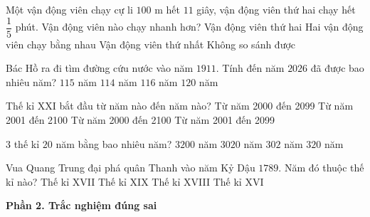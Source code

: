 \begin{ex} %
Một vận động viên chạy cự li $100\text{ m}$ hết $11$ giây, vận động viên thứ hai chạy hết $\dfrac{1}{5}$ phút. Vận động viên nào chạy nhanh hơn?
\choice
{Vận động viên thứ hai}
{Hai vận động viên chạy bằng nhau}
{\True Vận động viên thứ nhất}
{Không so sánh được}
\end{ex}

\begin{ex} %
Bác Hồ ra đi tìm đường cứu nước vào năm $1911$. Tính đến năm $2026$ đã được bao nhiêu năm?
\choice
{\True $115$ năm}
{$114$ năm}
{$116$ năm}
{$120$ năm}
\end{ex}

\begin{ex} %
Thế kỉ XXI bắt đầu từ năm nào đến năm nào?
\choice
{Từ năm 2000 đến 2099}
{\True Từ năm 2001 đến 2100}
{Từ năm 2000 đến 2100}
{Từ năm 2001 đến 2099}
\end{ex}

\begin{ex} %
$3$ thế kỉ $20$ năm bằng bao nhiêu năm?
\choice
{$3200$ năm}
{$3020$ năm}
{$302$ năm}
{\True $320$ năm}
\end{ex}

\begin{ex} %
Vua Quang Trung đại phá quân Thanh vào năm Kỷ Dậu $1789$. Năm đó thuộc thế kỉ nào?
\choice
{Thế kỉ XVII}
{Thế kỉ XIX}
{\True Thế kỉ XVIII}
{Thế kỉ XVI}
\end{ex}

\textbf{Phần 2. Trắc nghiệm đúng sai}

